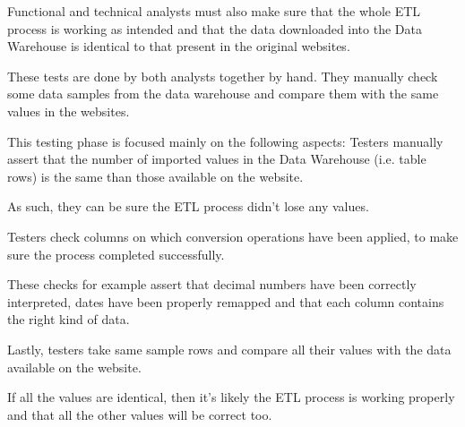 Functional and technical analysts must also make sure that the whole ETL process is working as intended and that the data downloaded into the Data Warehouse is identical to that present in the original websites.

These tests are done by both analysts together by hand.
They manually check some data samples from the data warehouse and compare them with the same values in the websites.

This testing phase is focused mainly on the following aspects:
    Testers manually assert that the number of imported values in the Data Warehouse (i.e. table rows) is the same than those available on the website.
    
    As such, they can be sure the ETL process didn't lose any values.

    Testers check columns on which conversion operations have been applied, to make sure the process completed successfully.
    
    These checks for example assert that decimal numbers have been correctly interpreted, dates have been properly remapped and that each column contains the right kind of data.
    
    Lastly, testers take same sample rows and compare all their values with the data available on the website.
    
    If all the values are identical, then it's likely the ETL process is working properly and that all the other values will be correct too.

